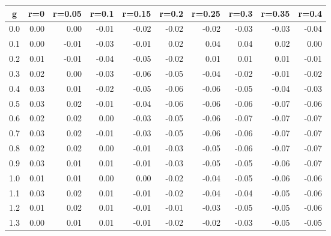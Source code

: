 %
\begin{table}[!tbp]
 \begin{center}
 \begin{tabular}{rrrrrrrrrr}\hline\hline
\multicolumn{1}{c}{g}&\multicolumn{1}{c}{r=0}&\multicolumn{1}{c}{r=0.05}&\multicolumn{1}{c}{r=0.1}&\multicolumn{1}{c}{r=0.15}&\multicolumn{1}{c}{r=0.2}&\multicolumn{1}{c}{r=0.25}&\multicolumn{1}{c}{r=0.3}&\multicolumn{1}{c}{r=0.35}&\multicolumn{1}{c}{r=0.4}\tabularnewline
\hline
0.0&0.00& 0.00&-0.01&-0.02&-0.02&-0.02&-0.03&-0.03&-0.04\tabularnewline
0.1&0.00&-0.01&-0.03&-0.01& 0.02& 0.04& 0.04& 0.02& 0.00\tabularnewline
0.2&0.01&-0.01&-0.04&-0.05&-0.02& 0.01& 0.01& 0.01&-0.01\tabularnewline
0.3&0.02& 0.00&-0.03&-0.06&-0.05&-0.04&-0.02&-0.01&-0.02\tabularnewline
0.4&0.03& 0.01&-0.02&-0.05&-0.06&-0.06&-0.05&-0.04&-0.03\tabularnewline
0.5&0.03& 0.02&-0.01&-0.04&-0.06&-0.06&-0.06&-0.07&-0.06\tabularnewline
0.6&0.02& 0.02& 0.00&-0.03&-0.05&-0.06&-0.07&-0.07&-0.07\tabularnewline
0.7&0.03& 0.02&-0.01&-0.03&-0.05&-0.06&-0.06&-0.07&-0.07\tabularnewline
0.8&0.02& 0.02& 0.00&-0.01&-0.03&-0.05&-0.06&-0.07&-0.07\tabularnewline
0.9&0.03& 0.01& 0.01&-0.01&-0.03&-0.05&-0.05&-0.06&-0.07\tabularnewline
1.0&0.01& 0.01& 0.00& 0.00&-0.02&-0.04&-0.05&-0.06&-0.06\tabularnewline
1.1&0.03& 0.02& 0.01&-0.01&-0.02&-0.04&-0.04&-0.05&-0.06\tabularnewline
1.2&0.01& 0.02& 0.01&-0.01&-0.01&-0.03&-0.05&-0.05&-0.06\tabularnewline
1.3&0.00& 0.01& 0.01&-0.01&-0.02&-0.02&-0.03&-0.05&-0.05\tabularnewline
\hline
\end{tabular}

\end{center}

\end{table}

